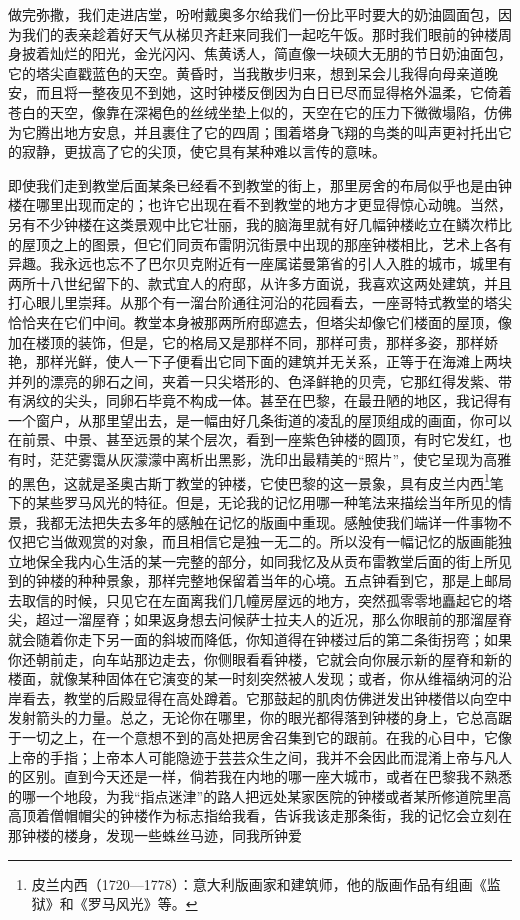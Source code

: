 \par 做完弥撒，我们走进店堂，吩咐戴奥多尔给我们一份比平时要大的奶油圆面包，因为我们的表亲趁着好天气从梯贝齐赶来同我们一起吃午饭。那时我们眼前的钟楼周身披着灿烂的阳光，金光闪闪、焦黄诱人，简直像一块硕大无朋的节日奶油面包，它的塔尖直戳蓝色的天空。黄昏时，当我散步归来，想到呆会儿我得向母亲道晚安，而且将一整夜见不到她，这时钟楼反倒因为白日已尽而显得格外温柔，它倚着苍白的天空，像靠在深褐色的丝绒坐垫上似的，天空在它的压力下微微塌陷，仿佛为它腾出地方安息，并且裹住了它的四周；围着塔身飞翔的鸟类的叫声更衬托出它的寂静，更拔高了它的尖顶，使它具有某种难以言传的意味。
\par 即使我们走到教堂后面某条已经看不到教堂的街上，那里房舍的布局似乎也是由钟楼在哪里出现而定的；也许它出现在看不到教堂的地方才更显得惊心动魄。当然，另有不少钟楼在这类景观中比它壮丽，我的脑海里就有好几幅钟楼屹立在鳞次栉比的屋顶之上的图景，但它们同贡布雷阴沉街景中出现的那座钟楼相比，艺术上各有异趣。我永远也忘不了巴尔贝克附近有一座属诺曼第省的引人入胜的城市，城里有两所十八世纪留下的、款式宜人的府邸，从许多方面说，我喜欢这两处建筑，并且打心眼儿里崇拜。从那个有一溜台阶通往河沿的花园看去，一座哥特式教堂的塔尖恰恰夹在它们中间。教堂本身被那两所府邸遮去，但塔尖却像它们楼面的屋顶，像加在楼顶的装饰，但是，它的格局又是那样不同，那样可贵，那样多姿，那样娇艳，那样光鲜，使人一下子便看出它同下面的建筑并无关系，正等于在海滩上两块并列的漂亮的卵石之间，夹着一只尖塔形的、色泽鲜艳的贝壳，它那红得发紫、带有涡纹的尖头，同卵石毕竟不构成一体。甚至在巴黎，在最丑陋的地区，我记得有一个窗户，从那里望出去，是一幅由好几条街道的凌乱的屋顶组成的画面，你可以在前景、中景、甚至远景的某个层次，看到一座紫色钟楼的圆顶，有时它发红，也有时，茫茫雾霭从灰濛濛中离析出黑影，洗印出最精美的“照片”，使它呈现为高雅的黑色，这就是圣奥古斯丁教堂的钟楼，它使巴黎的这一景象，具有皮兰内西\footnote{皮兰内西（1720—1778）：意大利版画家和建筑师，他的版画作品有组画《监狱》和《罗马风光》等。}笔下的某些罗马风光的特征。但是，无论我的记忆用哪一种笔法来描绘当年所见的情景，我都无法把失去多年的感触在记忆的版画中重现。感触使我们端详一件事物不仅把它当做观赏的对象，而且相信它是独一无二的。所以没有一幅记忆的版画能独立地保全我内心生活的某一完整的部分，如同我忆及从贡布雷教堂后面的街上所见到的钟楼的种种景象，那样完整地保留着当年的心境。五点钟看到它，那是上邮局去取信的时候，只见它在左面离我们几幢房屋远的地方，突然孤零零地矗起它的塔尖，超过一溜屋脊；如果返身想去问候萨士拉夫人的近况，那么你眼前的那溜屋脊就会随着你走下另一面的斜坡而降低，你知道得在钟楼过后的第二条街拐弯；如果你还朝前走，向车站那边走去，你侧眼看看钟楼，它就会向你展示新的屋脊和新的楼面，就像某种固体在它演变的某一时刻突然被人发现；或者，你从维福纳河的沿岸看去，教堂的后殿显得在高处蹲着。它那鼓起的肌肉仿佛迸发出钟楼借以向空中发射箭头的力量。总之，无论你在哪里，你的眼光都得落到钟楼的身上，它总高踞于一切之上，在一个意想不到的高处把房舍召集到它的跟前。在我的心目中，它像上帝的手指；上帝本人可能隐迹于芸芸众生之间，我并不会因此而混淆上帝与凡人的区别。直到今天还是一样，倘若我在内地的哪一座大城市，或者在巴黎我不熟悉的哪一个地段，为我“指点迷津”的路人把远处某家医院的钟楼或者某所修道院里高高顶着僧帽帽尖的钟楼作为标志指给我看，告诉我该走那条街，我的记忆会立刻在那钟楼的楼身，发现一些蛛丝马迹，同我所钟爱
